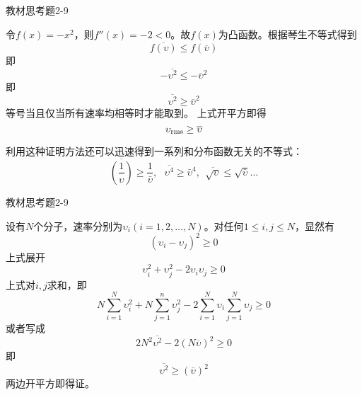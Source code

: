 \documentclass[CJK]{beamer}
\begin{document}
\begin{frame}
\bch
{\blue 教材思考题2-9}

{\small
令$f(x) = - x^2$，则$f''(x) = -2<0$。故$f(x)$为凸函数。根据琴生不等式得到
$$ \overline{f(\upsilon)} \le f(\overline{\upsilon})$$
即
$$  - \overline{\upsilon^2} \le - \overline{\upsilon}^2$$
即
$$  \overline{\upsilon^2} \ge \overline{\upsilon}^2$$
等号当且仅当所有速率均相等时才能取到。
上式开平方即得
$$ \upsilon_{\rm rms} \ge \overline{\upsilon}$$

利用这种证明方法还可以迅速得到一系列和分布函数无关的不等式：
$$\overline{\left(\frac{1}{\upsilon}\right)} \ge \frac{1}{\bar{\upsilon}},\ \ \ \overline{\upsilon^4} \ge \bar{\upsilon}^4, \ \ \overline{\sqrt{\upsilon}} \le \sqrt{\bar{\upsilon}} \ldots $$

}

\ech
\end{frame}


\begin{frame}
\bch
{\blue 教材思考题2-9}

{\scriptsize
设有$N$个分子，速率分别为$\upsilon_i (i = 1, 2, \ldots, N)$。对任何$1\le i, j\le N$，显然有
$$(\upsilon_i - \upsilon_j)^2 \ge 0$$
上式展开
$$ \upsilon_i^2 +  \upsilon_j^2 - 2 \upsilon_i\upsilon_j \ge 0$$
上式对$i, j$求和，即
$$ N \sum_{i=1}^N \upsilon_i^2 + N \sum_{j=1}^n \upsilon_j^2  - 2\sum_{i=1}^N \upsilon_i \sum_{j=1}^N\upsilon_j \ge 0$$
或者写成
$$2 N^2 \overline{\upsilon^2} - 2\left(N\overline{\upsilon}\right)^2 \ge 0$$
即 
$$ \overline{\upsilon^2} \ge \left(\overline{\upsilon}\right)^2 $$
两边开平方即得证。
}

\ech
\end{frame}
\end{document}
